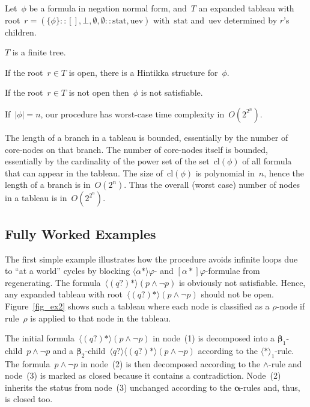 \documentclass{entcs}
\newcommand{\pnot}[1]{\lnot #1}
\newcommand{\pand}[2]{#1 \land #2}
\newcommand{\pea}[2]{\langle#1\rangle #2}
\newcommand{\paa}[2]{[#1] #2}
\newcommand{\prp}[1]{#1*}
\newcommand{\pip}[1]{#1?}
\newcommand{\pcl}[1]{\mathrm{cl}(#1)}
\newcommand{\tnode}[3]{(#1 :: #2 :: #3)}
\newcommand{\tmrk}{\mathrm{stat}}
\newcommand{\tuev}{\mathrm{uev}}
\newcommand{\talpha}{\boldsymbol{\alpha}}
\newcommand{\tbeta}{\boldsymbol{\beta}}
\newcommand{\trand}{$\pand{}{}$}
\newcommand{\trero}{$\pea{\prp{}}{}_1$}
\newcommand{\extst}{\pea{\prp{(\pip{q})}}{(\pand{p}{\pnot{p}})}}
\begin{document}
Let~$\phi$ be a formula in negation normal form,
and~$T$ an expanded tableau with root~$r = \tnode{\{\phi\}}{[], \bot, \emptyset, \emptyset}{\tmrk, \tuev}$
with~$\tmrk$ and~$\tuev$ determined by $r$'s children.
\begin{theorem}
  \label{thm_term}
  $T$ is a finite tree.
\end{theorem}
\begin{theorem}
  \label{theo_correctness}
  If the root~$r \in T$ is open, there is a Hintikka structure for~$\phi$.
\end{theorem}
\begin{theorem}
  \label{theo_completeness}
  If the root~$r \in T$ is not open then~$\phi$ is not satisfiable.
\end{theorem}
\begin{theorem}
  \label{theo_complexity}
  If~$|\phi| = n$, our procedure has worst-case time complexity in~$O(2^{2^{n}})$.
\end{theorem}
The length of a branch in a tableau is bounded, essentially
by the number of core-nodes on that branch.
The number of core-nodes itself is bounded, essentially
by the cardinality of the power set of the set~$\pcl{\phi}$ of all formula
that can appear in the tableau.
The size of~$\pcl{\phi}$ is polynomial in~$n$,
hence the length of a branch is in~$O(2^n)$.
Thus the overall (worst case) number of nodes in a tableau is in~$O(2^{2^n})$.


\subsection{Fully Worked Examples}

The first simple example illustrates
how the procedure avoids infinite loops due to ``at a world'' cycles
by blocking $\pea{\prp{\alpha}}{\varphi}$- and $\paa{\prp{\alpha}}{\varphi}$-formulae from regenerating.
The formula~$\extst$ is obviously not satisfiable.
Hence, any expanded tableau with root~$\extst$ should not be open.
Figure~\ref{fig_ex2} shows such a tableau
where each node is classified as a $\rho$-node
if rule~$\rho$ is applied to that node in the tableau.

The initial formula~$\extst$ in node~(1) 
is decomposed into a $\tbeta_1$-child~$\pand{p}{\pnot{p}}$
and a $\tbeta_2$-child~$\pea{\pip{q}}{\extst}$
according to the \trero{}-rule.
The formula~$\pand{p}{\pnot{p}}$ in node~(2) is then decomposed
according to the \trand{}-rule and node~(3) is marked as closed
because it contains a contradiction.
Node~(2) inherits the status from node~(3) unchanged 
according to the $\talpha$-rules
and, thus, is closed too.
\end{document}
